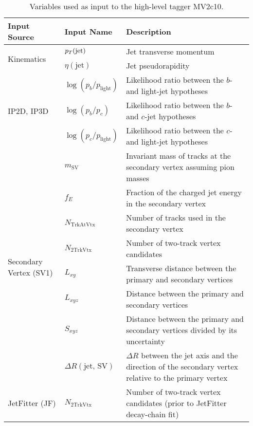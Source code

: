 \begin{table}[!htb]
    \caption{
        Variables used as input to the high-level tagger MV2c10.
    }
    \label{tab:ftag_mv2_inputs}
    \begin{scriptsize}
    \begin{center}
    \begin{tabularx}{\textwidth}{|X|l|X|}
    \hline
    \hline
    \textbf{Input Source} & \textbf{Input Name} & \textbf{Description} \\
    \hline
    \multirow{2}{*}{Kinematics} & $p_{T}(\text{jet})$ & Jet transverse momentum \\
    \cline{2-3}
                & $\eta(\text{jet})$ & Jet pseudorapidity \\
    \hline
    \multirow{3}{*}{IP2D, IP3D} & $\log(p_b/p_{\text{light}})$ & Likelihood ratio between the $b$- and light-jet hypotheses \\
    \cline{2-3}
                & $\log(p_b / p_c)$ & Likelihood ratio between the $b$- and $c$-jet hypotheses \\
    \cline{2-3}
                & $\log(p_c / p_{\text{light}})$ & Likelihood ratio between the $c$- and light-jet hypotheses \\
    \hline
    \multirow{8}{*}{Secondary Vertex (SV1)} & $m_{\text{SV}}$ & Invariant mass of tracks at the secondary vertex assuming pion masses \\
    \cline{2-3}
            & $f_E$ & Fraction of the charged jet energy in the secondary vertex \\
    \cline{2-3}
            & $N_{\text{TrkAtVtx}}$ & Number of tracks used in the secondary vertex \\
    \cline{2-3}
            & $N_{\text{2TrkVtx}}$ & Number of two-track vertex candidates \\
    \cline{2-3}
            & $L_{xy}$ & Transverse distance between the primary and secondary vertices \\
    \cline{2-3}
            & $L_{xyz}$ & Distance between the primary and secondary vertices \\
    \cline{2-3}
            & $S_{xyz}$ & Distance between the primary and secondary vertices divided by its uncertainty \\
    \cline{2-3}
            & $\Delta R(\text{jet, SV})$ & $\Delta R$ between the jet axis and the direction of the secondary vertex relative to the primary vertex \\
    \hline
    \multirow{8}{*}{JetFitter (JF)} & $N_{\text{2TrkVtx}}$ & Number of two-track vertex candidates (prior to JetFitter decay-chain fit) \\

\end{tabularx}
\end{center}
\end{scriptsize}
\end{table}
